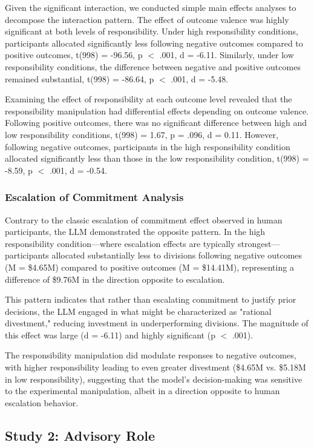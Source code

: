 \documentclass[letterpaper]{article} %
\begin{document}
Given the significant interaction, we conducted simple main effects analyses to decompose the interaction pattern. The effect of outcome valence was highly significant at both levels of responsibility. Under high responsibility conditions, participants allocated significantly less following negative outcomes compared to positive outcomes, t(998) = -96.56, p $<$ .001, d = -6.11. Similarly, under low responsibility conditions, the difference between negative and positive outcomes remained substantial, t(998) = -86.64, p $<$ .001, d = -5.48.

Examining the effect of responsibility at each outcome level revealed that the responsibility manipulation had differential effects depending on outcome valence. Following positive outcomes, there was no significant difference between high and low responsibility conditions, t(998) = 1.67, p = .096, d = 0.11. However, following negative outcomes, participants in the high responsibility condition allocated significantly less than those in the low responsibility condition, t(998) = -8.59, p $<$ .001, d = -0.54.

\subsubsection{Escalation of Commitment Analysis}

Contrary to the classic escalation of commitment effect observed in human participants, the LLM demonstrated the opposite pattern. In the high responsibility condition—where escalation effects are typically strongest—participants allocated substantially less to divisions following negative outcomes (M = \$4.65M) compared to positive outcomes (M = \$14.41M), representing a difference of \$9.76M in the direction opposite to escalation.

This pattern indicates that rather than escalating commitment to justify prior decisions, the LLM engaged in what might be characterized as "rational divestment," reducing investment in underperforming divisions. The magnitude of this effect was large (d = -6.11) and highly significant (p $<$ .001).

The responsibility manipulation did modulate responses to negative outcomes, with higher responsibility leading to even greater divestment (\$4.65M vs. \$5.18M in low responsibility), suggesting that the model's decision-making was sensitive to the experimental manipulation, albeit in a direction opposite to human escalation behavior.

\subsection{Study 2: Advisory Role}
\end{document}
